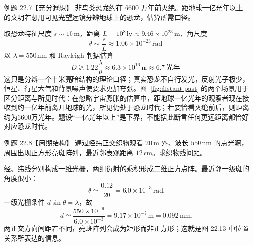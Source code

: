 \begin{origexamplebox}{例题 22.7【充分遐想】}
非鸟类恐龙约在 6600 万年前灭绝。距地球一亿光年以上的文明若想用可见光望远镜分辨地球上的恐龙，估算所需口径。
\end{origexamplebox}
\begin{xesolution}
取恐龙特征尺度 $s\sim10\,\mathrm m$，距离 $L=10^8\,\mathrm{ly}\approx9.46\times10^{23}\,\mathrm m$，角尺度
\[
 \theta\sim\frac sL\approx1.06\times10^{-23}\,\mathrm{rad}.
\]
以 $\lambda=550\,\mathrm{nm}$ 和 Rayleigh 判据估算
\[
 D\gtrsim1.22\frac\lambda\theta
 \approx6.3\times10^{16}\,\mathrm m
 \approx\boxed{6.7\ \text{光年}}.
\]
这只是分辨一个十米亮暗结构的理论口径；真实恐龙不自行发光，反射光子极少，恒星、行星大气和背景噪声使要求更加夸张。图~\ref{fig:distant-past} 的两个场景用于区分距离与所见时代：在忽略宇宙膨胀的估算中，距地球一亿光年的观察者现在接收到约一亿年前离开地球的光，所见仍处于恐龙时代；若要恰看灭绝前后，则距离约为6600万光年。题设“一亿光年以上”是下界，不能据此断言任何更远距离都恰好对应恐龙时代。
\end{xesolution}

\GridPatternDiagram

\begin{origexamplebox}{例题 22.8【周期结构】}
通过经纬正交织物观看 $20\,\mathrm m$ 外、波长 $550\,\mathrm{nm}$ 的点光源，周围出现正方形亮斑阵列，最近邻表观距离 $12\,\mathrm{cm}$。求织物线间距。
\end{origexamplebox}
\begin{xesolution}
经、纬线分别构成一维光栅，两组衍射的乘积形成二维正方点阵。最近邻一级斑的角度很小：
\[
 \theta\simeq\frac{0.12}{20}=6.0\times10^{-3}\,\mathrm{rad}.
\]
一级光栅条件 $d\sin\theta=\lambda$，故
\[
 \boxed{d\simeq\frac{550\times10^{-9}}{6.0\times10^{-3}}
 =9.17\times10^{-5}\,\mathrm m=0.092\,\mathrm{mm}}.
\]
两正交方向间距若不同，亮斑阵列会成为矩形而非正方形；这就是图 22.13 中位置关系所表达的信息。
\end{xesolution}

\ObliqueGratingDiagram

